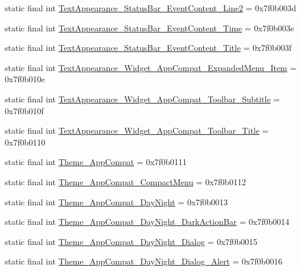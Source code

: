 \begin{CompactItemize}
\item 
static final int \hyperlink{classandroid_1_1support_1_1v7_1_1mediarouter_1_1_r_1_1style_f6c5c043fa6e7b7ada1ada360dc54d3d}{TextAppearance\_\-StatusBar\_\-EventContent\_\-Line2} = 0x7f0b003d
\item 
static final int \hyperlink{classandroid_1_1support_1_1v7_1_1mediarouter_1_1_r_1_1style_0b2b87639183f01256f71b9ac73513bd}{TextAppearance\_\-StatusBar\_\-EventContent\_\-Time} = 0x7f0b003e
\item 
static final int \hyperlink{classandroid_1_1support_1_1v7_1_1mediarouter_1_1_r_1_1style_949ba7878e05a4f096cb7c10ad5d8b64}{TextAppearance\_\-StatusBar\_\-EventContent\_\-Title} = 0x7f0b003f
\item 
static final int \hyperlink{classandroid_1_1support_1_1v7_1_1mediarouter_1_1_r_1_1style_b98f1f3934ce61123ee82d24f492ec21}{TextAppearance\_\-Widget\_\-AppCompat\_\-ExpandedMenu\_\-Item} = 0x7f0b010e
\item 
static final int \hyperlink{classandroid_1_1support_1_1v7_1_1mediarouter_1_1_r_1_1style_74e75abc0bf9158d1fd1bbccbcd857f8}{TextAppearance\_\-Widget\_\-AppCompat\_\-Toolbar\_\-Subtitle} = 0x7f0b010f
\item 
static final int \hyperlink{classandroid_1_1support_1_1v7_1_1mediarouter_1_1_r_1_1style_3cffdf9a34a8039c9287b33d408c4959}{TextAppearance\_\-Widget\_\-AppCompat\_\-Toolbar\_\-Title} = 0x7f0b0110
\item 
static final int \hyperlink{classandroid_1_1support_1_1v7_1_1mediarouter_1_1_r_1_1style_ecca583444a37c6477db7cc22dccf768}{Theme\_\-AppCompat} = 0x7f0b0111
\item 
static final int \hyperlink{classandroid_1_1support_1_1v7_1_1mediarouter_1_1_r_1_1style_252f4e379ad7c5fd2f76c1911589d076}{Theme\_\-AppCompat\_\-CompactMenu} = 0x7f0b0112
\item 
static final int \hyperlink{classandroid_1_1support_1_1v7_1_1mediarouter_1_1_r_1_1style_df70f45b32399da9413868c94d684fe8}{Theme\_\-AppCompat\_\-DayNight} = 0x7f0b0013
\item 
static final int \hyperlink{classandroid_1_1support_1_1v7_1_1mediarouter_1_1_r_1_1style_6dfe20c9eeb9cd92d13dba72a66fbfb6}{Theme\_\-AppCompat\_\-DayNight\_\-DarkActionBar} = 0x7f0b0014
\item 
static final int \hyperlink{classandroid_1_1support_1_1v7_1_1mediarouter_1_1_r_1_1style_a88c59d606e05dd9b906cf881ba405e2}{Theme\_\-AppCompat\_\-DayNight\_\-Dialog} = 0x7f0b0015
\item 
static final int \hyperlink{classandroid_1_1support_1_1v7_1_1mediarouter_1_1_r_1_1style_a6332c8400519d7310adc9fb506491c0}{Theme\_\-AppCompat\_\-DayNight\_\-Dialog\_\-Alert} = 0x7f0b0016

\end{CompactItemize}
